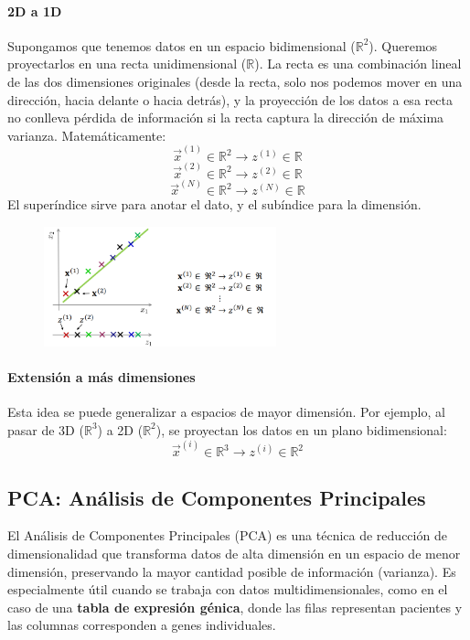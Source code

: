 \paragraph{2D a 1D}
Supongamos que tenemos datos en un espacio bidimensional ($\mathbb{R}^2$). Queremos proyectarlos en una recta unidimensional ($\mathbb{R}$). La recta es una combinación lineal de las dos dimensiones originales (desde la recta, solo nos podemos mover en una dirección, hacia delante o hacia detrás), y la proyección de los datos a esa recta no conlleva pérdida de información si la recta captura la dirección de máxima varianza. Matemáticamente:
$$\vec{x}^{(1)} \in \mathbb{R}^2 \rightarrow z^{(1)} \in \mathbb{R}$$
$$\vec{x}^{(2)} \in \mathbb{R}^2 \rightarrow z^{(2)} \in \mathbb{R}$$
$$\vec{x}^{(N)} \in \mathbb{R}^2 \rightarrow z^{(N)} \in \mathbb{R}$$
El superíndice sirve para anotar el dato, y el subíndice para la dimensión.

\begin{figure}[h]
\centering
\includegraphics[width = 0.6\textwidth]{figs/reduccion-dimension-2d.png}
\end{figure}

\paragraph{Extensión a más dimensiones}
Esta idea se puede generalizar a espacios de mayor dimensión. Por ejemplo, al pasar de 3D ($\mathbb{R}^3$) a 2D ($\mathbb{R}^2$), se proyectan los datos en un plano bidimensional:
$$\vec{x}^{(i)} \in \mathbb{R}^3 \rightarrow z^{(i)} \in \mathbb{R}^2$$

\subsection{PCA: Análisis de Componentes Principales}
El Análisis de Componentes Principales (PCA) es una técnica de reducción de dimensionalidad que transforma datos de alta dimensión en un espacio de menor dimensión, preservando la mayor cantidad posible de información (varianza). Es especialmente útil cuando se trabaja con datos multidimensionales, como en el caso de una \textbf{tabla de expresión génica}, donde las filas representan pacientes y las columnas corresponden a genes individuales.

